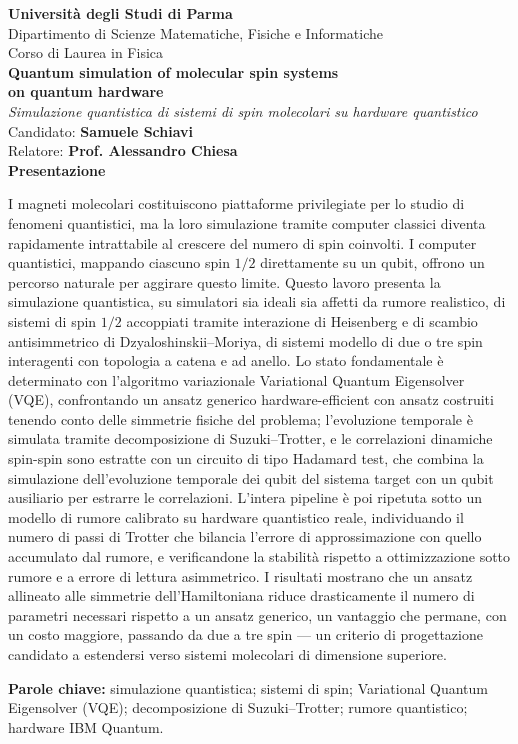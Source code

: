 \documentclass[11pt,a4paper]{article}
\begin{document}
\begin{center}
{\large\bfseries Università degli Studi di Parma}\\[2pt]
{\normalsize Dipartimento di Scienze Matematiche, Fisiche e Informatiche}\\[4pt]
{\normalsize Corso di Laurea in Fisica}\\[18pt]

{\Large\bfseries Quantum simulation of molecular spin systems\\ on quantum hardware}\\[6pt]
{\normalsize\itshape Simulazione quantistica di sistemi di spin molecolari su hardware quantistico}\\[18pt]

{\normalsize Candidato: \textbf{Samuele Schiavi}}\\[4pt]
{\normalsize Relatore: \textbf{Prof. Alessandro Chiesa}}\\[18pt]
{\normalsize\bfseries Presentazione}
\end{center}

\vspace{6pt}
\onehalfspacing
\noindent
I magneti molecolari costituiscono piattaforme privilegiate per lo
studio di fenomeni quantistici, ma la loro simulazione tramite computer
classici diventa rapidamente intrattabile al crescere del numero di spin
coinvolti. I computer quantistici, mappando ciascuno spin $1/2$ direttamente
su un qubit, offrono un percorso naturale per aggirare questo limite.
Questo lavoro presenta la simulazione quantistica, su simulatori sia ideali
sia affetti da rumore realistico, di sistemi di spin $1/2$ accoppiati
tramite interazione di Heisenberg e di scambio antisimmetrico di
Dzyaloshinskii--Moriya, di sistemi modello di due o tre spin interagenti con
topologia a catena e ad anello. Lo stato fondamentale è determinato con
l'algoritmo variazionale Variational Quantum Eigensolver (VQE), confrontando
un ansatz generico hardware-efficient con ansatz costruiti tenendo conto
delle simmetrie fisiche del problema; l'evoluzione temporale è simulata
tramite decomposizione di Suzuki--Trotter, e le correlazioni dinamiche
spin-spin sono estratte con un circuito di tipo Hadamard test, che combina
la simulazione dell'evoluzione temporale dei qubit del sistema target con un
qubit ausiliario per estrarre le correlazioni. L'intera pipeline è poi
ripetuta sotto un modello di rumore calibrato su hardware quantistico reale,
individuando il numero di passi di Trotter che bilancia l'errore di
approssimazione con quello accumulato dal rumore, e verificandone la
stabilità rispetto a ottimizzazione sotto rumore e a errore di lettura
asimmetrico. I risultati mostrano che un ansatz allineato alle simmetrie
dell'Hamiltoniana riduce drasticamente il numero di parametri necessari
rispetto a un ansatz generico, un vantaggio che permane, con un costo
maggiore, passando da due a tre spin --- un criterio di progettazione
candidato a estendersi verso sistemi molecolari di dimensione superiore.

\vspace{12pt}
\noindent\textbf{Parole chiave:} simulazione quantistica; sistemi di spin;
Variational Quantum Eigensolver (VQE); decomposizione di Suzuki--Trotter;
rumore quantistico; hardware IBM Quantum.
\end{document}
